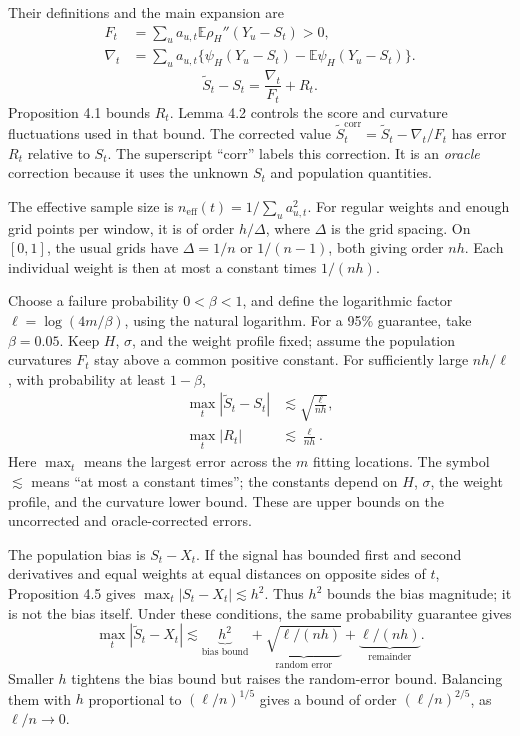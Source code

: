 \documentclass[11pt]{article}
\newcommand{\E}{\mathbb E}
\begin{document}
Their definitions and the main expansion are
\begin{align*}
  F_t&=\sum_u a_{u,t}\E\rho_H''(Y_u-S_t)>0,\\
  \nabla_t&=\sum_u a_{u,t}
    \bigl\{\psi_H(Y_u-S_t)-\E\psi_H(Y_u-S_t)\bigr\}.
\end{align*}
\[
  \boxed{\widetilde S_t-S_t=\frac{\nabla_t}{F_t}+R_t.}
\]
Proposition 4.1 bounds \(R_t\).  Lemma 4.2 controls the score and curvature
fluctuations used in that bound.  The corrected value
\(\widetilde S_t^{\mathrm{corr}}=\widetilde S_t-\nabla_t/F_t\) has error
\(R_t\) relative to \(S_t\).  The superscript ``corr'' labels this correction.
It is an \emph{oracle} correction because it uses the unknown \(S_t\) and
population quantities.

The effective sample size is \(n_{\mathrm{eff}}(t)=1/\sum_u a_{u,t}^2\).
For regular weights and enough grid points per window, it is of order
\(h/\Delta\), where \(\Delta\) is the grid spacing.  On \([0,1]\), the
usual grids have \(\Delta=1/n\) or \(1/(n-1)\), both giving order \(nh\).
Each individual weight is then at most a constant times \(1/(nh)\).

Choose a failure probability \(0<\beta<1\), and define the logarithmic factor
\(\ell=\log(4m/\beta)\), using the natural logarithm.  For a 95\% guarantee,
take \(\beta=0.05\).  Keep \(H\), \(\sigma\), and the weight profile fixed;
assume the population curvatures \(F_t\) stay above a common positive constant.
For sufficiently large \(nh/\ell\), with probability at least \(1-\beta\),
\[
  \boxed{\begin{aligned}
    \max_t|\widetilde S_t-S_t|
      &\lesssim\sqrt{\frac{\ell}{nh}},\\[3pt]
    \max_t|R_t|&\lesssim\frac{\ell}{nh}.
  \end{aligned}}
\]
Here \(\max_t\) means the largest error across the \(m\) fitting locations.
The symbol \(\lesssim\) means ``at most a constant times''; the constants
depend on \(H\), \(\sigma\), the weight profile, and the curvature lower
bound.  These are upper bounds on the uncorrected and oracle-corrected errors.

The population bias is \(S_t-X_t\).  If the signal has bounded first and
second derivatives and equal weights at equal distances on opposite sides of
\(t\), Proposition 4.5 gives \(\max_t|S_t-X_t|\lesssim h^2\).
Thus \(h^2\) bounds the bias magnitude; it is not the bias itself.
Under these conditions, the same probability guarantee gives
\[
  \max_t|\widetilde S_t-X_t|
  \lesssim
  \underbrace{h^2}_{\text{bias bound}}
  +\underbrace{\sqrt{\ell/(nh)}}_{\text{random error}}
  +\underbrace{\ell/(nh)}_{\text{remainder}}.
\]
Smaller \(h\) tightens the bias bound but raises the random-error bound.
Balancing them with \(h\) proportional to \((\ell/n)^{1/5}\) gives a bound
of order \((\ell/n)^{2/5}\), as \(\ell/n\to0\).
\end{document}
